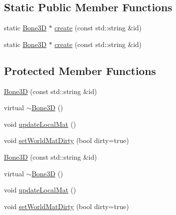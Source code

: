 \subsection*{Static Public Member Functions}
\begin{DoxyCompactItemize}
\item 
static \hyperlink{classBone3D}{Bone3D} $\ast$ \hyperlink{classBone3D_a1708607e00df296c7377df101d43219a}{create} (const std\+::string \&id)
\item 
static \hyperlink{classBone3D}{Bone3D} $\ast$ \hyperlink{classBone3D_aa22fa6c00c3c8600309c67917db36481}{create} (const std\+::string \&id)
\end{DoxyCompactItemize}
\subsection*{Protected Member Functions}
\begin{DoxyCompactItemize}
\item 
\hyperlink{classBone3D_a3e3acf00c8e4393609c241f82db764b7}{Bone3D} (const std\+::string \&id)
\item 
virtual \hyperlink{classBone3D_a98adf937eb08c046d99154ba66c9699d}{$\sim$\+Bone3D} ()
\item 
void \hyperlink{classBone3D_a3e5720b8df7a2d25d3d21362177949f8}{update\+Local\+Mat} ()
\item 
void \hyperlink{classBone3D_a106b423193457bdc905e9a61d041d5d0}{set\+World\+Mat\+Dirty} (bool dirty=true)
\item 
\hyperlink{classBone3D_a3e3acf00c8e4393609c241f82db764b7}{Bone3D} (const std\+::string \&id)
\item 
virtual \hyperlink{classBone3D_a3548570bb866e539f51e8553689d7ce4}{$\sim$\+Bone3D} ()
\item 
void \hyperlink{classBone3D_a3e5720b8df7a2d25d3d21362177949f8}{update\+Local\+Mat} ()
\item 
void \hyperlink{classBone3D_a106b423193457bdc905e9a61d041d5d0}{set\+World\+Mat\+Dirty} (bool dirty=true)
\end{DoxyCompactItemize}
